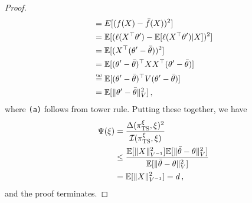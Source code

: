 \documentclass[letter, 12pt]{report}
\newcommand{\explan}[1]{\stackrel{\text{\tiny \texttt{#1}}}}
\newcommand{\E}{\mathbb E}
\newcommand{\I}{\mathcal{I}}
\newcommand{\1}{\mathbf{1}}
\newcommand{\ts}{\textsc{TS}\xspace}
\theoremstyle{plain}
\theoremstyle{definition}
\theoremstyle{remark}
\begin{document}
\begin{proof}
\begin{align*}
         & =
        E[(f(X) - \bar{f}(X))^2]                                            \\
         & =
        \E[(\ell(X^\top \theta') - \E[\ell(X^\top \theta')|X])^2]           \\
         & =
        \E[(X^\top (\theta' - \bar{\theta}))^2]                             \\
         & =
        \E[(\theta' - \bar{\theta})^\top X X^\top (\theta' - \bar{\theta})] \\
         &
        \explan{(a)}
        =
        \E[(\theta' - \bar{\theta})^\top V (\theta' - \bar{\theta})]        \\
         & =
        \E[\|\theta' - \bar{\theta}\|_V^2]\,,
    \end{align*}
    where \texttt{(a)} follows from tower rule.
    Putting these together, we have
    \begin{align*}
        \Psi(\xi)
         & =
        \frac{\Delta(\pi^\xi_\ts, \xi)^2}{\I(\pi^\xi_\ts, \xi)}
        \\
         & \leq
        \frac{
        \E[\|X\|^2_{V^{-1}}]
        \E[\|\bar{\theta} - \theta\|^2_{V}]
        }{
        \E[\|\bar{\theta} - \theta\|^2_{V}]
        }
        \\
         & =
        \E[\|X\|^2_{V^{-1}}]
        =d\,,
    \end{align*}
    and the proof terminates.
\end{proof}
\end{document}
